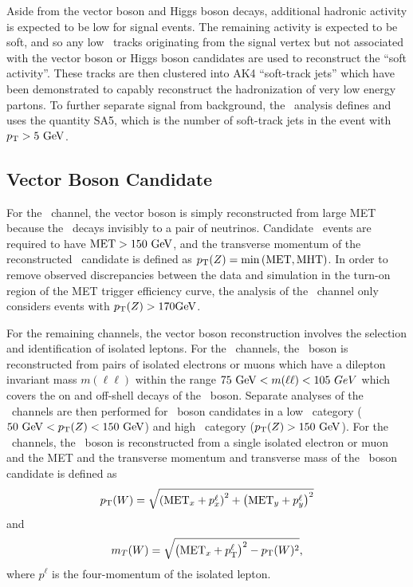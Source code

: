 Aside from the vector boson and Higgs boson decays, additional hadronic activity is expected to be low for signal events. The remaining activity is expected to be soft, and so any low \pT\ tracks originating from the signal vertex but not associated with the vector boson or Higgs boson candidates are used to reconstruct the ``soft activity''. These tracks are then clustered into AK4 ``soft-track jets'' which have been demonstrated to capably reconstruct the hadronization of very low energy partons.\cite{CMSTRACKJETS} To further separate signal from background, the \VHbb\ analysis defines and uses the quantity SA5, which is the number of soft-track jets in the event with $p_{\mathrm{T}} > 5\ \mathrm{GeV}$.

\subsection{Vector Boson Candidate}

For the \ZnnH\ channel, the vector boson is simply reconstructed from large MET because the \bosZ\ decays invisibly to a pair of neutrinos. Candidate \ZnnH\ events are required to have $\mathrm{MET} > 150\ \mathrm{GeV}$, and the transverse momentum of the reconstructed \bosZ\ candidate is defined as $p_{\mathrm{T}}(Z) = \min \left( \mathrm{MET}, \mathrm{MHT} \right)$. In order to remove observed discrepancies between the data and simulation in the turn-on region of the MET trigger efficiency curve, the analysis of the \ZnnH\ channel only considers events with $p_{\mathrm{T}}(Z) > 170 \mathrm{GeV}$.

For the remaining channels, the vector boson reconstruction involves the selection and identification of isolated leptons. For the \ZllH\ channels, the \bosZ\ boson is reconstructed from pairs of isolated electrons or muons which have a dilepton invariant mass $m(\ell\ell)$ within the range $75\ \mathrm{GeV} < m(\ell\ell) < 105\ GeV$ which covers the on and off-shell decays of the \bosZ\ boson. Separate analyses of the \ZllH\ channels are then performed for \bosZ\ boson candidates in a low \pT\ category ($50\ \mathrm{GeV} < p_{\mathrm{T}}(Z) < 150\ \mathrm{GeV}$) and high \pT\ category ($p_{\mathrm{T}}(Z) > 150\ \mathrm{GeV}$). For the \WlnH\ channels, the \bosW\ boson is reconstructed from a single isolated electron or muon and the MET and the transverse momentum and transverse mass of the \bosW\ boson candidate is defined as
\begin{equation}
  \pT(\bosW) = \sqrt{\left( \mathrm{MET}_{x} + p_{x}^{\ell} \right)^{2} + \left( \mathrm{MET}_{y} + p_{y}^{\ell} \right)^{2}}
  \label{eq:WlnWpT}
\end{equation}
and
\begin{equation}
  m_{T}(\bosW) = \sqrt{\left( \mathrm{MET}_{x} + p_{\mathrm{T}}^{\ell} \right)^{2} - \pT(\bosW)^{2}},
  \label{eq:WlnWmT}
\end{equation}
where $p^{\ell}$ is the four-momentum of the isolated lepton.

